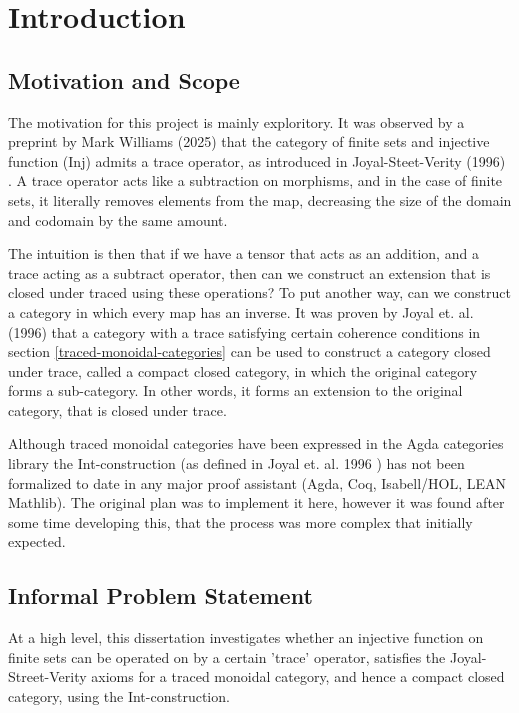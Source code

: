 \chapter{Introduction} \label{introduction}
\section{Motivation and Scope}
The motivation for this project is mainly exploritory. It was observed
by a preprint by Mark Williams (2025) \cite{williams2025-vsets} that the
category of finite sets and injective function (\textrm{Inj}) admits a
trace operator, as introduced in Joyal-Steet-Verity
(1996)\cite{joyal1996-traced-monoidal-categories} . A trace operator
acts like a subtraction on morphisms, and in the case of finite sets,
it literally removes elements from the map, decreasing the size of the
domain and codomain by the same amount.

The intuition is then that if we have a tensor that acts as an
addition, and a trace acting as a subtract operator, then can we
construct an extension that is closed under traced using these
operations? To put another way, can we construct a category in
which every map has an inverse. It was proven by Joyal
et. al. (1996) \cite{joyal1996-traced-monoidal-categories} that a
category with a trace satisfying certain coherence conditions in
section \ref{traced-monoidal-categories} can
be used to construct a category closed under trace, called a compact
closed category, in which the original category forms a
sub-category. In other words, it forms an extension to the original
category, that is closed under trace.

Although traced monoidal categories have been expressed in the Agda
categories library\cite{agda-categories} the \textrm{Int}-construction (as
defined in Joyal et. al. 1996 \cite{joyal1996-traced-monoidal-categories})
has not been formalized to date in any major proof assistant
(Agda\cite{vezzosi2021-cubical-agda-dependently},
Coq\cite{team2021-coq-proof-assistant},
Isabell/HOL\cite{nipkow2002-isabelle}, LEAN
Mathlib\cite{mathlib2020}). The original plan was to implement it
here, however it was found after some time developing this, that the
process was more complex that initially expected.

\section{Informal Problem Statement}
At a high level, this dissertation investigates whether an injective
function on finite sets can be operated on by a certain 'trace'
operator, satisfies the Joyal-Street-Verity axioms
\cite{joyal1996-traced-monoidal-categories} for a traced monoidal
category, and hence a compact closed category, using the
Int-construction.

